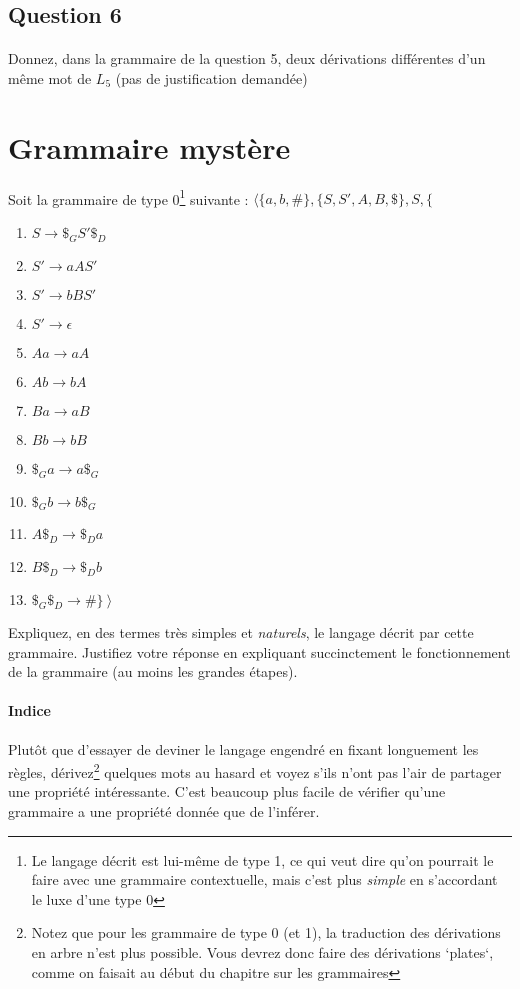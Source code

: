 \documentclass{article}[11pt]
\theoremstyle{definition}
\begin{document}
\subsection*{Question 6}

\paragraph*{}Donnez, dans la grammaire de la question 5, deux dérivations différentes d'un même mot de $L_5$ (pas de justification demandée)

\newpage
\section{Grammaire mystère}

\noindent
Soit la grammaire de type 0\footnote{Le langage décrit est lui-même de type 1, ce qui veut dire qu'on pourrait le faire avec une grammaire contextuelle, mais c'est plus \textit{simple} en s'accordant le luxe d'une type 0} suivante : $\big \langle \{a,b,\#\}, \{S,S',A,B,\$\},S,\{$

\begin{enumerate}

\item $S \rightarrow \$_GS'\$_D$
\item $S' \rightarrow aAS'$
\item $S' \rightarrow bBS'$
\item $S' \rightarrow \epsilon$
\item $Aa \rightarrow aA$
\item $Ab \rightarrow bA$
\item $Ba \rightarrow aB$
\item $Bb \rightarrow bB$
\item $\$_Ga \rightarrow a\$_G$
\item $\$_Gb \rightarrow b\$_G$
\item $A\$_D \rightarrow \$_Da$
\item $B\$_D \rightarrow \$_Db$
\item $\$_G\$_D \rightarrow \#\}\ \big \rangle$

\end{enumerate}

\noindent
Expliquez, en des termes très simples et \textit{naturels}, le langage décrit par cette grammaire. Justifiez votre réponse en expliquant succinctement le fonctionnement de la grammaire (au moins les grandes étapes).

\paragraph*{Indice} Plutôt que d'essayer de deviner le langage engendré en fixant longuement les règles, dérivez\footnote{Notez que pour les grammaire de type 0 (et 1), la traduction des dérivations en arbre n'est plus possible. Vous devrez donc faire des dérivations `plates`, comme on faisait au début du chapitre sur les grammaires} quelques mots au hasard et voyez s'ils n'ont pas l'air de partager une propriété intéressante. C'est beaucoup plus facile de vérifier qu'une grammaire a une propriété donnée que de l'inférer. 
\end{document}
